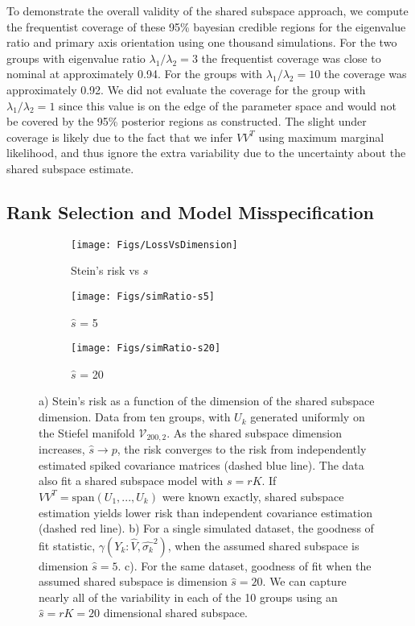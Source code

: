 \documentclass[12pt]{article}
\begin{document}
To demonstrate the overall validity of the shared subspace approach,
we compute the frequentist coverage of these 95\% bayesian credible
regions for the eigenvalue ratio and primary axis orientation using
one thousand simulations.  For the two groups with eigenvalue ratio
$\lambda_1/\lambda_2 = 3$ the frequentist coverage was close to
nominal at approximately 0.94.  For the groups with
$\lambda_1/\lambda_2 = 10$ the coverage was approximately 0.92.  We
did not evaluate the coverage for the group with
$\lambda_1/\lambda_2 = 1$ since this value is on the edge of the
parameter space and would not be covered by the 95\% posterior regions
as constructed.  The slight under coverage is likely due to the fact
that we infer $VV^T$ using maximum marginal likelihood, and thus
ignore the extra variability due to the uncertainty about the shared
subspace estimate.

\subsection{Rank Selection and Model Misspecification}

\begin{figure}[t]
    \centering
    \begin{subfigure}[b]{0.3\textwidth}
        \texttt{[image: Figs/LossVsDimension]}
        \caption{Stein's risk vs $\hat{s}$}
        \label{fig:sdimension}
    \end{subfigure}
    \begin{subfigure}[b]{0.3\textwidth}
        \texttt{[image: Figs/simRatio-s5]}
        \caption{$\hat{s}$ = 5}
        \label{fig:ratio-s5}
    \end{subfigure}
    \begin{subfigure}[b]{0.3\textwidth}
        \texttt{[image: Figs/simRatio-s20]}
        \caption{$\hat{s}$ = 20}
        \label{fig:ratio-s20}
    \end{subfigure}
    \caption{a) Stein's risk as a function of the dimension of the
      shared subspace dimension.  Data from ten groups, with $U_k$
      generated uniformly on the Stiefel manifold
      $\mathcal{V}_{200, 2}$.  As the shared subspace dimension
      increases, $\hat{s} \rightarrow p$, the risk converges to the
      risk from independently estimated spiked covariance matrices
      (dashed blue line).  The data also fit a shared subspace model
      with $s=rK$.  If $VV^T = \text{span}(U_1, ..., U_k)$ were known
      exactly, shared subspace estimation yields lower risk than
      independent covariance estimation (dashed red line).  b) For a
      single simulated dataset, the goodness of fit statistic,
      $\gamma(Y_k: \hat{V}, \hat{\sigma_k}^2)$, when the assumed
      shared subspace is dimension $\hat{s} = 5$.  c).  For the same
      dataset, goodness of fit when the assumed shared subspace is
      dimension $\hat{s} = 20$.  We can capture nearly all of the
      variability in each of the 10 groups using an $\hat{s}=rK=20$
      dimensional shared subspace. }
\label{fig:dimensionPlots}
\end{figure}
\end{document}

